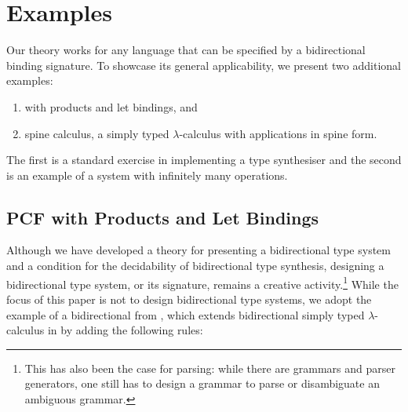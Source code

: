 
\section{Examples}\label{sec:example}
Our theory works for any language that can be specified by a bidirectional binding signature.
To showcase its general applicability, we present two additional examples:
\begin{enumerate}
\item \PCF with products and let bindings, and
\item spine calculus, a simply typed $\lambda$-calculus with applications in spine form.
\end{enumerate}
The first is a standard exercise in implementing a type synthesiser and the second is an example of a system with infinitely many operations.

\subsection{PCF with Products and Let Bindings}\label{subsec:PCF}
Although we have developed a theory for presenting a bidirectional type system and a condition for the decidability of bidirectional type synthesis, designing a bidirectional type system, or its signature, remains a creative activity.\footnote{This has also been the case for parsing: while there are grammars and parser generators, one still has to design a grammar to parse or disambiguate an ambiguous grammar.}
While the focus of this paper is not to design bidirectional type systems, we adopt the example of a bidirectional \PCF from \citet{Wadler2022}, which extends bidirectional simply typed $\lambda$-calculus in  by adding the following rules:
\bgroup
\small
\egroup


